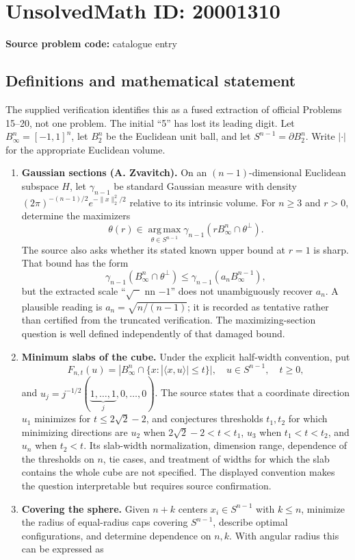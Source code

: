 \documentclass[11pt]{article}
\begin{document}
\section*{UnsolvedMath ID: 20001310}
\textbf{Source problem code:} catalogue entry
\subsection{Definitions and mathematical statement}
The supplied verification identifies this as a fused extraction of official Problems 15--20, not one problem. The initial ``5'' has lost its leading digit. Let $B_\infty^n=[-1,1]^n$, let $B_2^n$ be the Euclidean unit ball, and let $S^{n-1}=\partial B_2^n$. Write $|\cdot|$ for the appropriate Euclidean volume.

\begin{enumerate}
\item[15.] \textbf{Gaussian sections (A. Zvavitch).} On an $(n-1)$-dimensional Euclidean subspace $H$, let $\gamma_{n-1}$ be standard Gaussian measure with density $(2\pi)^{-(n-1)/2}e^{-\|x\|_2^2/2}$ relative to its intrinsic volume. For $n\geq3$ and $r>0$, determine the maximizers
\[
 \theta(r)\in\operatorname*{arg\,max}_{\theta\in S^{n-1}}
 \gamma_{n-1}(rB_\infty^n\cap\theta^\perp).
\]
The source also asks whether its stated known upper bound at $r=1$ is sharp. That bound has the form
\[
 \gamma_{n-1}(B_\infty^n\cap\theta^\perp)
 \leq\gamma_{n-1}(a_nB_\infty^{n-1}),
\]
but the extracted scale ``$\sqrt{\phantom n}$ nn $-1$'' does not unambiguously recover $a_n$. A plausible reading is $a_n=\sqrt{n/(n-1)}$; it is recorded as tentative rather than certified from the truncated verification. The maximizing-section question is well defined independently of that damaged bound.
\item[16.] \textbf{Minimum slabs of the cube.} Under the explicit half-width convention, put
\[
 F_{n,t}(u)=|B_\infty^n\cap\{x:|\langle x,u\rangle|\leq t\}|,
 \quad u\in S^{n-1},\quad t\geq0,
\]
and $u_j=j^{-1/2}(\underbrace{1,\ldots,1}_{j},0,\ldots,0)$. The source states that a coordinate direction $u_1$ minimizes for $t\leq2\sqrt2-2$, and conjectures thresholds $t_1,t_2$ for which minimizing directions are $u_2$ when $2\sqrt2-2<t<t_1$, $u_3$ when $t_1<t<t_2$, and $u_n$ when $t_2<t$. Its slab-width normalization, dimension range, dependence of the thresholds on $n$, tie cases, and treatment of widths for which the slab contains the whole cube are not specified. The displayed convention makes the question interpretable but requires source confirmation.
\item[17.] \textbf{Covering the sphere.} Given $n+k$ centers $x_i\in S^{n-1}$ with $k\leq n$, minimize the radius of equal-radius caps covering $S^{n-1}$, describe optimal configurations, and determine dependence on $n,k$. With angular radius this can be expressed as

\end{enumerate}
\end{document}
